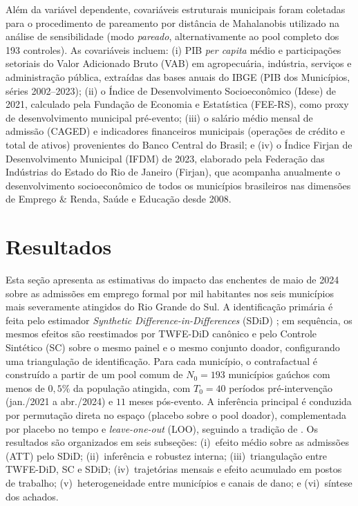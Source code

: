 \documentclass[a4paper,12pt]{article}
\begin{document}
Além da variável dependente, covariáveis estruturais municipais foram coletadas para o
procedimento de pareamento por distância de Mahalanobis utilizado na análise de
sensibilidade (modo \emph{pareado}, alternativamente ao pool completo dos 193 controles).
As covariáveis incluem: (i) PIB \textit{per capita} médio e participações setoriais do Valor
Adicionado Bruto (VAB) em agropecuária, indústria, serviços e administração pública,
extraídas das bases anuais do IBGE (PIB dos Municípios, séries 2002–2023); (ii) o Índice
de Desenvolvimento Socioeconômico (Idese) de 2021, calculado pela Fundação de
Economia e Estatística (FEE-RS), como proxy de desenvolvimento municipal pré-evento;
(iii) o salário médio mensal de admissão (CAGED) e indicadores financeiros municipais
(operações de crédito e total de ativos) provenientes do Banco Central do Brasil;
e (iv) o Índice Firjan de Desenvolvimento Municipal (IFDM) de 2023, elaborado pela
Federação das Indústrias do Estado do Rio de Janeiro (Firjan), que acompanha anualmente
o desenvolvimento socioeconômico de todos os municípios brasileiros nas dimensões de
Emprego \& Renda, Saúde e Educação desde 2008.


\section{Resultados}
\label{sec:resultados}

Esta seção apresenta as estimativas do impacto das enchentes de maio de 2024
sobre as admissões em emprego formal por mil habitantes nos seis municípios
mais severamente atingidos do Rio Grande do Sul. A identificação primária é
feita pelo estimador \textit{Synthetic Difference-in-Differences} (SDiD)
\cite{arkhangelsky2021}; em sequência, os mesmos efeitos são reestimados por
TWFE-DiD canônico e pelo Controle Sintético (SC) sobre o mesmo painel e o
mesmo conjunto doador, configurando uma triangulação de identificação. Para
cada município, o contrafactual é construído a partir de um pool comum de
$N_0 = 193$ municípios gaúchos com menos de $0{,}5\%$ da população atingida,
com $T_0 = 40$ períodos
pré-intervenção (jan./2021 a abr./2024) e $11$ meses pós-evento. A inferência
principal é conduzida por permutação direta no espaço (placebo sobre o pool
doador), complementada por placebo no tempo e \textit{leave-one-out} (LOO),
seguindo a tradição de . Os resultados são
organizados em seis subseções: (i)~efeito médio sobre as admissões (ATT) pelo
SDiD; (ii)~inferência e robustez interna; (iii)~triangulação entre TWFE-DiD,
SC e SDiD; (iv)~trajetórias mensais e efeito acumulado em postos de trabalho;
(v)~heterogeneidade entre municípios e canais de dano; e (vi)~síntese dos
achados.
\end{document}
